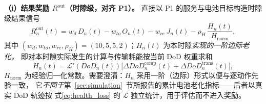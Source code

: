 \documentclass[a4paper,11pt]{article}
\begin{document}
\noindent\textbf{（i）结果奖励 $R^{\mathrm{out}}$（时隙级，对齐 P1）。}
直接以 P1 的服务与电池目标构造时隙级结果信号
\begin{equation}
R^{\mathrm{out}}_n(t) = w_d\, D_n(t) - w_{to}\, O_n(t) - w_{re}\, J_n(t)
- \rho_H\, \frac{H_n(t)}{H_{\mathrm{norm}}},
\label{eq:reward_obj}
\end{equation}
其中 $(w_d,w_{to},w_{re},\rho_H)=(10,5,5,2)$；$H_n(t)$ 为本时隙\emph{实现的一阶边际老化}，
即对本时隙实际发生的计算与传输耗能按当前 DoD 权重求和
\begin{equation}
H_n(t) = \mathcal{L}'(DoD_n(t))\Big[\Delta DoD^{\mathrm{comp}}_n(t)+\Delta DoD^{\mathrm{trans}}_n(t)\Big],
\label{eq:H_slot}
\end{equation}
$H_{\mathrm{norm}}$ 为经验归一化常数。需要澄清：$H_n$ 采用一阶（边际）形式以便与逐动作先验一致，
它\emph{不同于}第~\ref{sec:simulation}~节所报告的累计电池老化指标——后者以真实 DoD 轨迹按
式\eqref{eq:health_loss} 的 $\mathcal{L}$ 独立统计，用于评估而不进入奖励。
\end{document}
